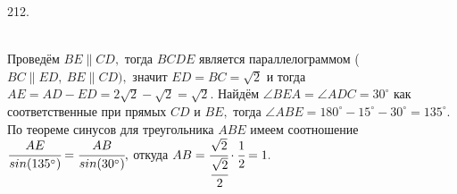 212. \begin{figure}[ht!]
\end{figure}\\
Проведём $BE\parallel CD,$ тогда $BCDE$ является параллелограммом ($BC\parallel ED,\ BE\parallel CD),$ значит $ED=BC=\sqrt{2}$ и тогда $AE=AD-ED=2\sqrt{2}-\sqrt{2}=\sqrt{2}.$ Найдём $\angle BEA=\angle ADC=30^\circ$ как соответственные при прямых $CD$ и $BE,$ тогда $\angle ABE=180^\circ-15^\circ-30^\circ=135^\circ.$ По теореме синусов для треугольника $ABE$ имеем соотношение $\cfrac{AE}{sin(135^\circ)}=\cfrac{AB}{sin(30^\circ)},$ откуда $AB=\cfrac{\sqrt{2}}{\cfrac{\sqrt{2}}{2}}\cdot\cfrac{1}{2}=1.$\\

